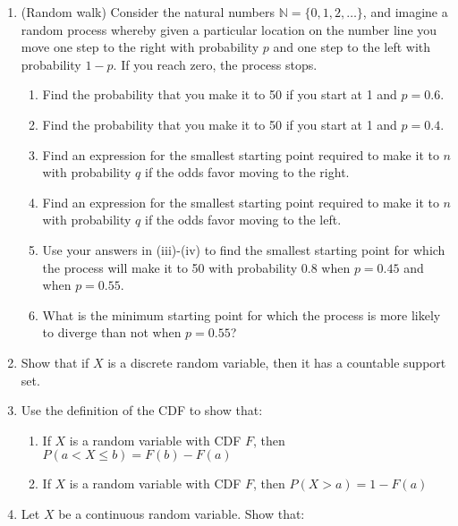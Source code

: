 \documentclass[
  letterpaper,
  DIV=11,
  numbers=noendperiod]{scrartcl}
\providecommand{\tightlist}{%
  \setlength{\itemsep}{0pt}\setlength{\parskip}{0pt}}\usepackage{longtable,booktabs,array}
\begin{document}
\begin{enumerate}
\def\labelenumi{\arabic{enumi}.}
\item
  (Random walk) Consider the natural numbers
  \(\mathbb{N} = \{0, 1, 2, \dots\}\), and imagine a random process
  whereby given a particular location on the number line you move one
  step to the right with probability \(p\) and one step to the left with
  probability \(1 - p\). If you reach zero, the process stops.

  \begin{enumerate}
  \def\labelenumii{\roman{enumii}.}
  \tightlist
  \item
    Find the probability that you make it to 50 if you start at 1 and
    \(p = 0.6\).
  \item
    Find the probability that you make it to 50 if you start at 1 and
    \(p = 0.4\).
  \item
    Find an expression for the smallest starting point required to make
    it to \(n\) with probability \(q\) if the odds favor moving to the
    right.
  \item
    Find an expression for the smallest starting point required to make
    it to \(n\) with probability \(q\) if the odds favor moving to the
    left.
  \item
    Use your answers in (iii)-(iv) to find the smallest starting point
    for which the process will make it to 50 with probability \(0.8\)
    when \(p=0.45\) and when \(p = 0.55\).
  \item
    What is the minimum starting point for which the process is more
    likely to diverge than not when \(p = 0.55\)?
  \end{enumerate}
\item
  Show that if \(X\) is a discrete random variable, then it has a
  countable support set.
\item
  Use the definition of the CDF to show that:

  \begin{enumerate}
  \def\labelenumii{\roman{enumii}.}
  \tightlist
  \item
    If \(X\) is a random variable with CDF \(F\), then
    \(P(a < X \leq b) = F(b) - F(a)\)
  \item
    If \(X\) is a random variable with CDF \(F\), then
    \(P(X > a) = 1 - F(a)\)
  \end{enumerate}
\item
  Let \(X\) be a continuous random variable. Show that:


\end{enumerate}
\end{document}
